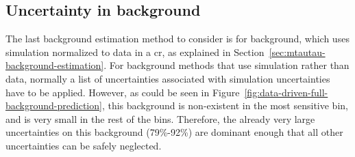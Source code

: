 \subsection{Uncertainty in \ztautau background}
\label{simulated-background-uncertainties}

The last background estimation method to consider is for \tautau background, which uses simulation normalized to data in a \gls{cr}, as explained in Section~\ref{sec:mtautau-background-estimation}. For background methods that use simulation rather than data, normally a list of uncertainties associated with simulation uncertainties have to be applied. However, as could be seen in Figure~\ref{fig:data-driven-full-background-prediction}, this background is non-existent in the most sensitive bin, and is very small in the rest of the bins. Therefore, the already very large uncertainties on this background (79\%-92\%) are dominant enough that all other uncertainties can be safely neglected.

